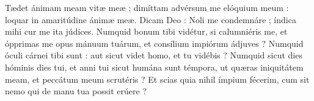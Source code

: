 
Tædet ánimam meam vitæ meæ ; dimíttam advérsum me elóquium meum : loquar in amaritúdine ánimæ meæ.
Dicam Deo : Noli me condemnáre ; índica mihi cur me ita júdices.
Numquid bonum tibi vidétur, si calumniéris me, et ópprimas me opus mánuum tuárum, et consílium impiórum ádjuves ?
Numquid óculi cárnei tibi sunt : aut sicut videt homo, et tu vidébis ?
Numquid sicut dies hóminis dies tui, et anni tui sicut humána sunt témpora,
ut quæras iniquitátem meam, et peccátum meum scrutéris ?
Et scias quia nihil ímpium fécerim, cum sit nemo qui de manu tua possit erúere ?